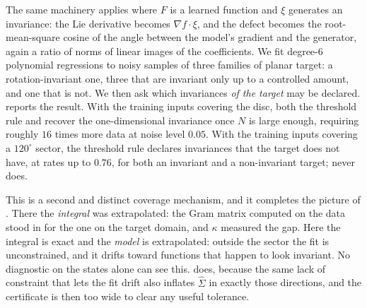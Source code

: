 The same machinery applies where $F$ is a learned function and $\xi$ generates
an invariance: the Lie derivative becomes $\nabla f \cdot \xi$, and the defect
becomes the root-mean-square cosine of the angle between the model's gradient
and the generator, again a ratio of norms of linear images of the
coefficients. We fit degree-$6$ polynomial regressions to noisy samples of
three families of planar target: a rotation-invariant one, three that are
invariant only up to a controlled amount, and one that is not. We then ask
which invariances \emph{of the target} may be declared. 
reports the result. With the training inputs covering the disc, both the
threshold rule and \symcert{} recover the one-dimensional invariance once $N$
is large enough, \symcert{} requiring roughly $16$ times more data at noise
level $0.05$. With the training inputs covering a $120^\circ$ sector, the
threshold rule declares invariances that the target does not have, at rates up
to $0.76$, for both an invariant and a non-invariant target; \symcert{} never
does.

This is a second and distinct coverage mechanism, and it completes the picture
of . There the \emph{integral} was extrapolated: the Gram
matrix computed on the data stood in for the one on the target domain, and
$\kappa$ measured the gap. Here the integral is exact and the \emph{model} is
extrapolated: outside the sector the fit is unconstrained, and it drifts
toward functions that happen to look invariant. No diagnostic on the states
alone can see this. \symcert{} does, because the same lack of constraint that
lets the fit drift also inflates $\hat\Sigma$ in exactly those directions, and
the certificate is then too wide to clear any useful tolerance.
